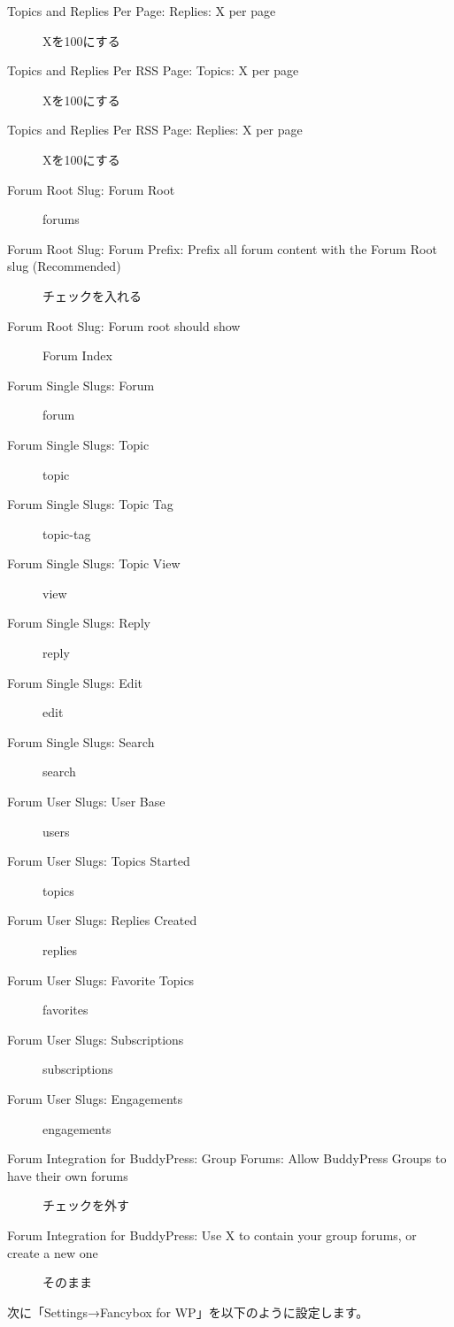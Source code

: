 \documentclass[titlepage,10pt,a4paper,uplatex]{jsbook}
\begin{document}
\begin{description}
\item[Topics and Replies Per Page: Replies: X per page] Xを100にする
\item[Topics and Replies Per RSS Page: Topics: X per page] Xを100にする
\item[Topics and Replies Per RSS Page: Replies: X per page] Xを100にする
\item[Forum Root Slug: Forum Root] forums
\item[Forum Root Slug: Forum Prefix: Prefix all forum content with the Forum Root slug (Recommended)] チェックを入れる
\item[Forum Root Slug: Forum root should show] Forum Index
\item[Forum Single Slugs: Forum] forum
\item[Forum Single Slugs: Topic] topic
\item[Forum Single Slugs: Topic Tag] topic-tag
\item[Forum Single Slugs: Topic View] view
\item[Forum Single Slugs: Reply] reply
\item[Forum Single Slugs: Edit] edit
\item[Forum Single Slugs: Search] search
\item[Forum User Slugs: User Base] users
\item[Forum User Slugs: Topics Started] topics
\item[Forum User Slugs: Replies Created] replies
\item[Forum User Slugs: Favorite Topics] favorites
\item[Forum User Slugs: Subscriptions] subscriptions
\item[Forum User Slugs: Engagements] engagements
\item[Forum Integration for BuddyPress: Group Forums: Allow BuddyPress Groups to have their own forums] チェックを外す
\item[Forum Integration for BuddyPress: Use X to contain your group forums, or create a new one] そのまま
\end{description}

次に「Settings→Fancybox for WP」を以下のように設定します。
\end{document}
